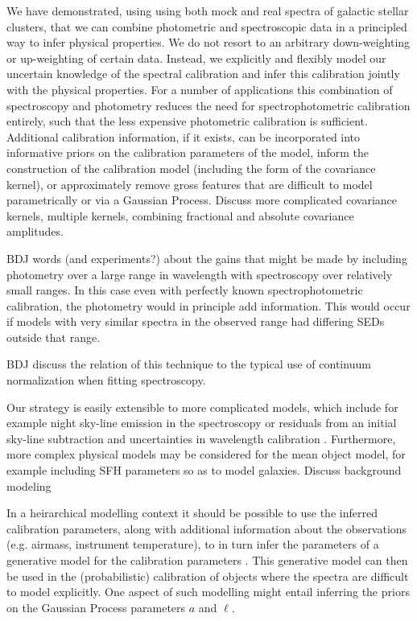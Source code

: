 \documentclass[iop,numberedappendix]{emulateapj}
\begin{document}
We have demonstrated, using using both mock and real spectra of
galactic stellar clusters, that we can combine photometric and
spectroscopic data in a principled way to infer physical properties.
We do not resort to an arbitrary down-weighting or up-weighting of
certain data. Instead, we explicitly and flexibly model our uncertain
knowledge of the spectral calibration and infer this calibration
jointly with the physical properties. For a number of applications
this combination of spectroscopy and photometry reduces the need for
spectrophotometric calibration entirely, such that the less expensive
photometric calibration is sufficient.  Additional calibration
information, if it exists, can be incorporated into informative priors
on the calibration parameters of the model, inform the construction of
the calibration model (including the form of the covariance kernel),
or approximately remove gross features that are difficult to model
parametrically or via a Gaussian Process.  {\color{blue} Discuss more
complicated covariance kernels, multiple kernels, combining fractional
and absolute covariance amplitudes.}

{\color{blue} BDJ words (and experiments?) about the gains that might
be made by including photometry over a large range in wavelength with
spectroscopy over relatively small ranges.}  In this case even with
perfectly known spectrophotometric calibration, the photometry would
in principle add information.  This would occur if models with very
similar spectra in the observed range had differing SEDs outside that
range.

{\color{blue} BDJ discuss the relation of this technique to the typical use of
continuum normalization when fitting spectroscopy.}

Our strategy is easily extensible to more complicated models, which
include for example night sky-line emission in the spectroscopy
\citep[e.g.,][]{gullikson14} or residuals from an initial sky-line
subtraction and uncertainties in wavelength calibration
\citep[e.g.,][]{walker15}. Furthermore, more complex physical models
may be considered for the mean object model, for example including SFH
parameters so as to model galaxies. {\color{blue} Discuss background
modeling}

In a heirarchical modelling context it should be possible to use the
inferred calibration parameters, along with additional information
about the observations (e.g. airmass, instrument temperature), to in
turn infer the parameters of a generative model for the calibration
parameters \citep[e.g.][]{spectrophot}. This generative model can then
be used in the (probabilistic) calibration of objects where the
spectra are difficult to model explicitly.  One aspect of such
modelling might entail inferring the priors on the Gaussian Process
parameters $a$ and $\ell$.
\end{document}
